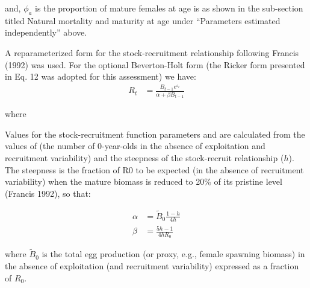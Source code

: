 \documentclass[11pt,
  english,
  a4paper,
]{article}
\begin{document}

and, {\(\phi_a\)\leavevmode\tagmcend\tagstructend} is the proportion of mature females at age is as shown in the sub-section titled Natural mortality and maturity at age under ``Parameters estimated independently'' above.

\leavevmode\tagmcend\tagstructend\par


A reparameterized form for the stock-recruitment relationship following Francis (1992) was used. For the optional Beverton-Holt form (the Ricker form presented in Eq. 12 was adopted for this assessment) we have: \begin{align}
R_t &= \frac{B_{t-1}e^{\varepsilon_t} }{\alpha+\beta B_{t-1} }
\end{align}

\leavevmode\tagmcend\tagstructend\par

where


Values for the stock-recruitment function parameters and are calculated from the values of (the number of 0-year-olds in the absence of exploitation and recruitment variability) and the steepness of the stock-recruit relationship ({\(h\)\leavevmode\tagmcend\tagstructend}). The steepness is the fraction of R0 to be expected (in the absence of recruitment variability) when the mature biomass is reduced to 20\% of its pristine level (Francis 1992), so that:

\leavevmode\tagmcend\tagstructend\par


\begin{align}
 \alpha &= \tilde B_0 \frac{1-h}{4h} \\
 \beta &= \frac{5h-1}{4hR_0 } 
\end{align}

\leavevmode\tagmcend\tagstructend\par


where {\(\tilde B_0\)\leavevmode\tagmcend\tagstructend} is the total egg production (or proxy, e.g., female spawning biomass) in the absence of exploitation (and recruitment variability) expressed as a fraction of {\(R_0\)\leavevmode\tagmcend\tagstructend}.
\end{document}
